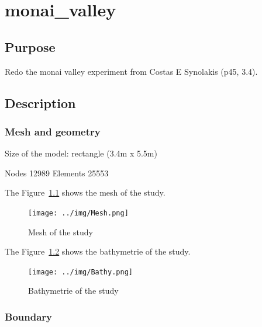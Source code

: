 \chapter{monai\_valley}

\section{Purpose}

Redo the monai valley experiment from Costas E Synolakis (p45, 3.4)\cite{Costas2007}.

\section{Description}

\subsection{Mesh and geometry}

Size of the model: rectangle (3.4m x 5.5m)

Nodes   12989
Elements  25553

The Figure~\ref{fig:monai:mesh} shows the mesh of the study.
\begin{figure}
\centering
\texttt{[image: ../img/Mesh.png]}
\caption{Mesh of the study}\label{fig:monai:mesh}
\end{figure}

The Figure~\ref{fig:monai:bathy} shows the bathymetrie of the study.
\begin{figure}
\centering
\texttt{[image: ../img/Bathy.png]}
\caption{Bathymetrie of the study}\label{fig:monai:bathy}
\end{figure}

\subsection{Boundary}

